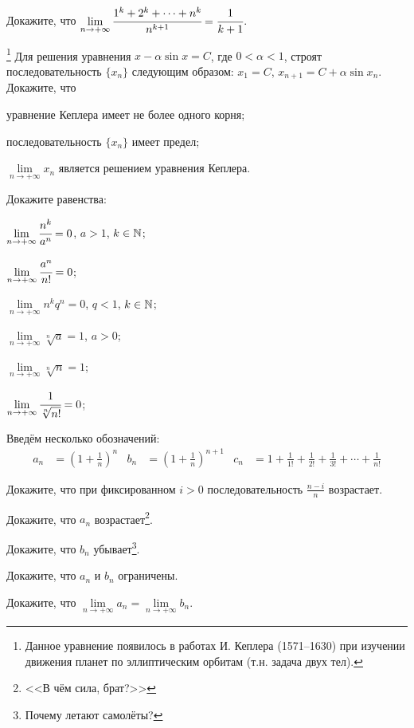 \documentclass[a4paper, 12pt, num=31]{listok}
\begin{document}
\begin{problem}
    Докажите, что $\lim\limits_{n \to + \infty} \cfrac{1^k + 2^k + \cdots + n^k}{n^{k + 1}} = \cfrac1{k + 1}$.
\end{problem}
\begin{problem}\footnote{%
        Данное уравнение появилось в работах И. Кеплера (1571--1630) при изучении движения планет по эллиптическим орбитам (т.н. задача двух тел).}
    Для решения уравнения $x - \alpha \sin x = C$, где $0 < \alpha < 1$,
    строят последовательность $\{x_n\}$ следующим образом: $x_1 = C$, $x_{n + 1} = C + \alpha \sin x_n$.
    Докажите, что
    \begin{probparts}
        \item уравнение Кеплера имеет не более одного корня;
        \item последовательность $\{x_n\}$ имеет предел;
        \item $\lim\limits_{n\to +\infty} x_n$ является решением уравнения Кеплера.
    \end{probparts}
\end{problem}
\begin{problem}[(\textup{[:|||:]})]
    Докажите равенства:
    \begin{probparts}
        \item $\lim\limits_{n \to + \infty} \cfrac{n^k}{a^n} = 0$, $a > 1$, $k \in \mathbb{N}$;
        \item $\lim\limits_{n \to + \infty} \cfrac{a^n}{n!} = 0$;
        \item $\lim\limits_{n \to + \infty} {n^k}{q^n} = 0$, $q < 1$, $k \in \mathbb{N}$;
        \item $\lim\limits_{n \to + \infty} \sqrt[n]a = 1$, $a > 0$;
        \item $\lim\limits_{n \to + \infty} \sqrt[n]n = 1$;
        \item $\lim\limits_{n \to + \infty} \cfrac1{\sqrt[n]{n!}} = 0$;
    \end{probparts}
\end{problem}
\begin{definition}
    Введём несколько обозначений:
    \begin{align*}
        a_n &= {\left ( 1 + \frac 1n \right )}^n &
        b_n &= {\left ( 1 + \frac 1n \right )}^{n + 1} &
        c_n &= 1 + \frac1{1!} + \frac1{2!} + \frac1{3!} + \cdots + \frac1{n!}
    \end{align*}
\end{definition}
\begin{problem}
\begin{probparts}
    \item Докажите, что при фиксированном $i > 0$ последовательность $\frac{n - i}n$ возрастает.
    \item Докажите, что $a_n$ возрастает\footnote{<<В чём сила, брат?>>}.
    \item Докажите, что $b_n$ убывает\footnote{Почему летают самолёты?}.
    \item Докажите, что $a_n$ и $b_n$ ограничены.
    \item Докажите, что $\lim\limits_{n \to +\infty} a_n = \lim\limits_{n \to + \infty} b_n$.
\end{probparts}
\end{problem}
\end{document}
